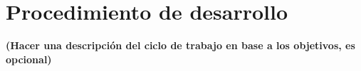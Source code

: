 \section{Procedimiento de desarrollo}\label{sc:ProcDesa}

\textbf{(Hacer una descripción del ciclo de trabajo en base a los objetivos, es opcional)}